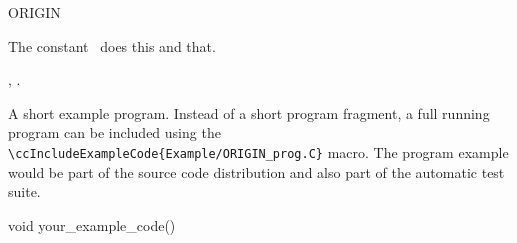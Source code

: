 

\begin{ccRefConstant}{ORIGIN}  %


\ccDefinition
  
The constant \ccRefName\ does this and that.



\ccSeeAlso

,
.

\ccExample

A short example program.
Instead of a short program fragment, a full running program can be
included using the 
\verb|\ccIncludeExampleCode{Example/ORIGIN_prog.C}| 
macro. The program example would be part of the source code distribution and
also part of the automatic test suite.

\begin{ccExampleCode}
void your_example_code() {
}
\end{ccExampleCode}


\end{ccRefConstant}


